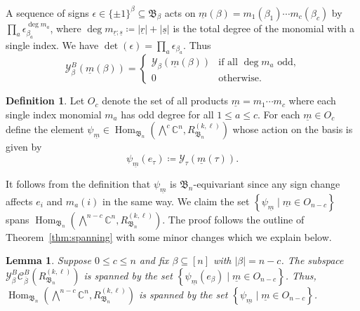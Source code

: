 \documentclass[11pt, reqno]{amsart}
\newtheorem{lemma}[theorem]{Lemma}
\theoremstyle{definition}
\newtheorem{definition}[theorem]{Definition}
\theoremstyle{remark}
\numberwithin{equation}{section}
\newcommand{\0}{\emptyset}
\newcommand{\C}{\mathbb{C}}
\newcommand{\cC}{\mathcal{C}}
\newcommand{\cY}{\mathcal{Y}}
\newcommand{\m}{\underline{m}}
\renewcommand{\r}{\underline{r}}
\newcommand{\s}{\underline{s}}
\DeclareMathOperator{\Hom}{Hom}
\begin{document}
A sequence of signs $\epsilon \in \{\pm 1\}^\beta \subseteq \mathfrak{B}_\beta$ 
acts on $\m(\beta) = m_1(\beta_1) \cdots m_c (\beta_c)$ by $\prod_a \epsilon_{\beta_a}^{\deg m_a}$, 
where $\deg m_{\r;\s} \coloneqq |\r|+|\s|$ is the total degree 
of the monomial with a single index. We have $\det(\epsilon) = \prod_a \epsilon_{\beta_a}$. 
Thus
\begin{equation}\label{eq:YB-monomial}
    \cY^B_\beta ( \m(\beta)) = 
    \begin{cases}
        \cY_\beta ( \m(\beta)) & \text{if all $\deg m_a$ odd,}\\
        0 & \text{otherwise.}
    \end{cases}
\end{equation} 

\begin{definition} 
Let $O_c$ denote the set of all products $\m=m_1\cdots m_c$ where each single index monomial $m_a$ has odd degree for all $1 \leq a \leq c$. For each $\m \in O_c$ define the element $\psi_{\m} \in \Hom_{\mathfrak{B}_n}\left(\bigwedge^c \C^n, R_{\mathfrak{B}_n}^{(k,\ell)}\right)$ whose action on the basis is given by
\[
    \psi_{\m}(e_\tau) \coloneqq \cY_\tau(\m(\tau)).
\]
\end{definition}

It follows from the definition that $\psi_{\m}$ is 
$\mathfrak{B}_n$-equivariant since any sign change affects $e_i$ and $m_a(i)$ in the same way.
We claim the set $\left\{\psi_{\m} \mid \m \in O_{n-c}\right\}$ spans 
$\Hom_{\mathfrak{B}_n}\left(\bigwedge^{n-c} \C^n, R_{\mathfrak{B}_n}^{(k,\ell)}\right)$. 
The proof follows the outline of Theorem~\ref{thm:spanning} 
with some minor changes which we explain below. 

\begin{lemma}\label{lem:spanning-B}
    Suppose $0 \leq c \leq n$ and fix $\beta \subseteq [n]$ with $|\beta| =n-c$. 
    The subspace 
    $\cY^B_\beta\cC^B_{\overline{\beta}}\left(R_{\mathfrak{B}_n}^{(k,\ell)}\right)$
    is spanned by the set
    $\left\{ \psi_{\m}(e_\beta) \mid \m \in O_{n-c}\right\}$. 
    Thus, 
    $\Hom_{\mathfrak{B}_n}\left(\bigwedge^{n-c} \C^n, R_{\mathfrak{B}_n}^{(k,\ell)}\right)$
    is spanned by the set 
    $\left\{ \psi_{\m} \mid \m \in O_{n-c}\right\}$.
\end{lemma}
\end{document}
